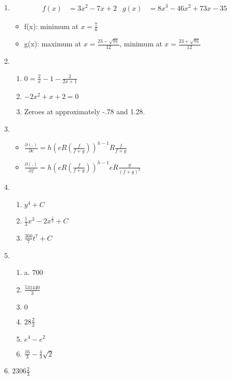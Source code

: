 \documentclass[11pt]{article}
\begin{document}
\begin{enumerate}
\item 
\begin{align*}
f(x) &= 3x^2 - 7x + 2 &  g(x) &= 8x^3 - 46x^2 + 73x - 35
\end{align*}
\begin{itemize}
\item f(x): minimum at $x=\frac{7}{6}$
\item g(x): maximum at $x=\frac{23-\sqrt{91}}{12}$, minimum at $x=\frac{23+\sqrt{91}}{12}$
\end{itemize}



\item 
\begin{enumerate}
\item $0 = \frac{2}{x} - 1 - \frac{2}{2x+1}$
\item $-2x^2 + x + 2 = 0$
\item Zeroes at approximately -.78 and 1.28.
\end{enumerate}




\item 
\begin{itemize}
\item $\frac{\partial(.)}{\partial e} = h(eR(\frac{f}{f+g}))^{h-1}R\frac{f}{f+g} $
\item $\frac{\partial(.)}{\partial f} =h(eR(\frac{f}{f+g}))^{h-1}eR\frac{g}{(f+g)^2} $
\end{itemize} 




\item 
  \begin{enumerate}
   \item $y^4 + C$
   \item $\frac{1}{3}x^3 - 2x^\frac{1}{2} + C$ 
   \item $\frac{360}{7}t^7 + C$
  \end{enumerate}



\item 
\begin{enumerate}
 \item a. $700$
 \item $\frac{531440}{3}$
 \item $0$
 \item $28\frac{2}{3}$ 
 \item $e^4 - e^2$
 \item $\frac{16}{3} - \frac{4}{3}\sqrt{2}$
\end{enumerate}





\item $2306\frac{2}{3}$




\end{enumerate}
\end{document}
